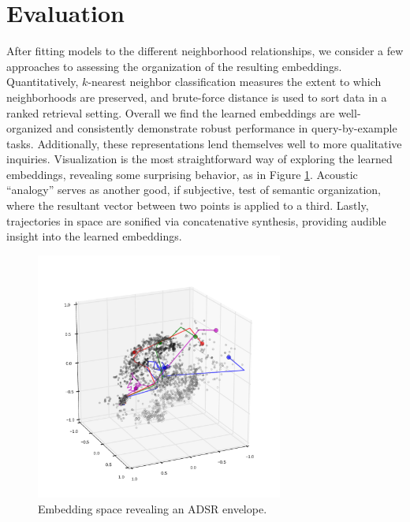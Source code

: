 \documentclass{article}
\begin{document}
\section{Evaluation}

After fitting models to the different neighborhood relationships, we consider a few approaches to assessing the organization of the resulting embeddings.
Quantitatively, $k$-nearest neighbor classification measures the extent to which neighborhoods are preserved, and brute-force distance is used to sort data in a ranked retrieval setting.
Overall we find the learned embeddings are well-organized and consistently demonstrate robust performance in query-by-example tasks.
Additionally, these representations lend themselves well to more qualitative inquiries.
Visualization is the most straightforward way of exploring the learned embeddings, revealing some surprising behavior, as in Figure \ref{fig:asdr}.
Acoustic ``analogy'' serves as another good, if subjective, test of semantic organization, where the resultant vector between two points is applied to a third.
Lastly, trajectories in space are sonified via concatenative synthesis, providing audible insight into the learned embeddings.



\begin{figure}[!t]
\vskip -0.2in
\begin{center}
\centerline{\includegraphics[width=3.2in]{inst-pitch-d2_adsr.pdf}}
\vskip -0.2in
\caption{Embedding space revealing an ADSR envelope.}
\label{fig:asdr}
\end{center}
\end{figure}
\end{document}
